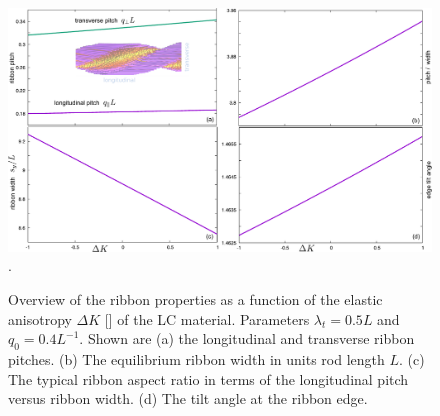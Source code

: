 \begin{figure}
\begin{center}
\includegraphics[width=   \columnwidth]{figures/chapter-5/deltak}.
\caption[Overview of the ribbon properties as a function of the elastic anisotropy]{ \label{ribbontheory} Overview of the ribbon properties as a function of the elastic anisotropy $\Delta K$ [] of the LC material. Parameters $\lambda_{t} = 0.5 L$ and $q_{0} = 0.4 L^{-1}$. Shown are (a) the longitudinal and transverse ribbon pitches. (b) The equilibrium ribbon width in units rod length $L$. (c) The typical ribbon aspect ratio in terms of the longitudinal pitch versus ribbon width. (d) The tilt angle at the ribbon edge.   }
\end{center}
\end{figure}


